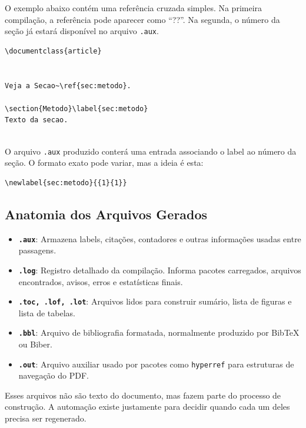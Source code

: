 O exemplo abaixo contém uma referência cruzada simples. Na primeira compilação, a referência pode aparecer como ``??''. Na segunda, o número da seção já estará disponível no arquivo \texttt{.aux}.

\begin{lstlisting}[language={[latex]TeX}, caption={Referência cruzada simples}]
\documentclass{article}


Veja a Secao~\ref{sec:metodo}.

\section{Metodo}\label{sec:metodo}
Texto da secao.


\end{lstlisting}

O arquivo \texttt{.aux} produzido conterá uma entrada associando o label ao número da seção. O formato exato pode variar, mas a ideia é esta:

\begin{lstlisting}[caption={Informação registrada no arquivo auxiliar}]
\newlabel{sec:metodo}{{1}{1}}
\end{lstlisting}

\subsection{Anatomia dos Arquivos Gerados}
\begin{itemize}
    \item \textbf{\texttt{.aux}}: Armazena labels, citações, contadores e outras informações usadas entre passagens.
    \item \textbf{\texttt{.log}}: Registro detalhado da compilação. Informa pacotes carregados, arquivos encontrados, avisos, erros e estatísticas finais.
    \item \textbf{\texttt{.toc, .lof, .lot}}: Arquivos lidos para construir sumário, lista de figuras e lista de tabelas.
    \item \textbf{\texttt{.bbl}}: Arquivo de bibliografia formatada, normalmente produzido por BibTeX ou Biber.
    \item \textbf{\texttt{.out}}: Arquivo auxiliar usado por pacotes como \texttt{hyperref} para estruturas de navegação do PDF.
\end{itemize}

Esses arquivos não são texto do documento, mas fazem parte do processo de construção. A automação existe justamente para decidir quando cada um deles precisa ser regenerado.

